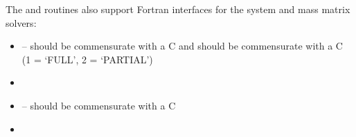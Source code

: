 The  and  routines also support
Fortran interfaces for the system and mass matrix solvers:
\begin{itemize}
\item {} -- 
  should be commensurate with a C  and 
  should be commensurate with a C  (1 = `FULL', 2 = `PARTIAL')
\item {}
\item {} -- 
  should be commensurate with a C 
\item {}
\end{itemize}
